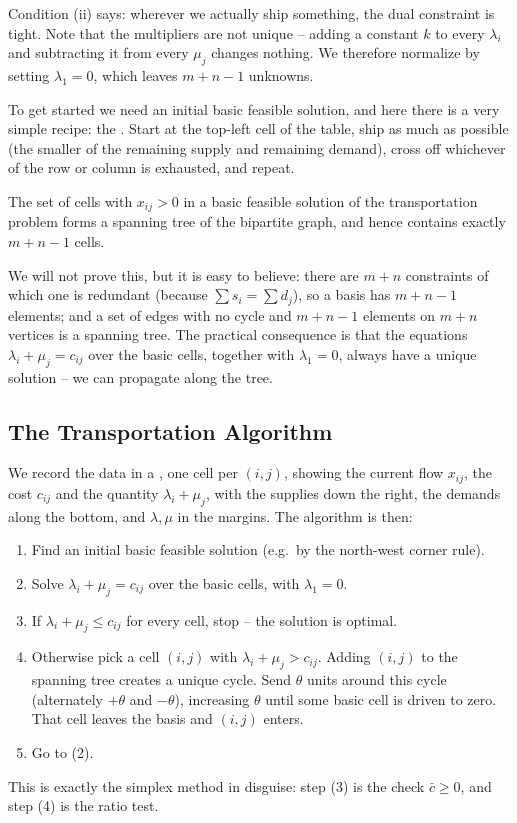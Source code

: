 \documentclass[a4paper]{scrartcl}
\begin{document}
Condition (ii) says: wherever we actually ship something, the dual constraint is tight. Note that the multipliers are not unique -- adding a constant $k$ to every $\lambda_i$ and subtracting it from every $\mu_j$ changes nothing. We therefore normalize by setting $\lambda_1 = 0$, which leaves $m + n - 1$ unknowns.

To get started we need an initial basic feasible solution, and here there is a very simple recipe: the . Start at the top-left cell of the table, ship as much as possible (the smaller of the remaining supply and remaining demand), cross off whichever of the row or column is exhausted, and repeat.

\begin{theorem}
    The set of cells with $x_{ij} > 0$ in a basic feasible solution of the transportation problem forms a spanning tree of the bipartite graph, and hence contains exactly $m + n - 1$ cells.
\end{theorem}

We will not prove this, but it is easy to believe: there are $m + n$ constraints of which one is redundant (because $\sum s_i = \sum d_j$), so a basis has $m + n - 1$ elements; and a set of edges with no cycle and $m+n-1$ elements on $m+n$ vertices is a spanning tree. The practical consequence is that the equations $\lambda_i + \mu_j = c_{ij}$ over the basic cells, together with $\lambda_1 = 0$, always have a unique solution -- we can propagate along the tree.

\subsection{The Transportation Algorithm}

We record the data in a , one cell per $(i,j)$, showing the current flow $x_{ij}$, the cost $c_{ij}$ and the quantity $\lambda_i + \mu_j$, with the supplies down the right, the demands along the bottom, and $\lambda, \mu$ in the margins. The algorithm is then:
\begin{enumerate}[label=(\arabic*)]
    \item Find an initial basic feasible solution (e.g.\ by the north-west corner rule).
    \item Solve $\lambda_i + \mu_j = c_{ij}$ over the basic cells, with $\lambda_1 = 0$.
    \item If $\lambda_i + \mu_j \leq c_{ij}$ for every cell, stop -- the solution is optimal.
    \item Otherwise pick a cell $(i,j)$ with $\lambda_i + \mu_j > c_{ij}$. Adding $(i,j)$ to the spanning tree creates a unique cycle. Send $\theta$ units around this cycle (alternately $+\theta$ and $-\theta$), increasing $\theta$ until some basic cell is driven to zero. That cell leaves the basis and $(i,j)$ enters.
    \item Go to (2).
\end{enumerate}
This is exactly the simplex method in disguise: step (3) is the check $\bar c \geq 0$, and step (4) is the ratio test.
\end{document}
